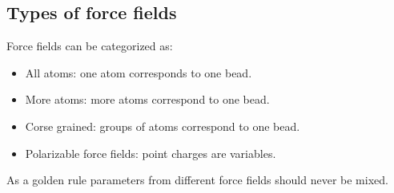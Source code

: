 	\subsection{Types of force fields}
	Force fields can be categorized as:

	\begin{multicols}{2}
		\begin{itemize}
			\item All atoms: one atom corresponds to one bead.
			\item More atoms: more atoms correspond to one bead.
			\item Corse grained: groups of atoms correspond to one bead.
			\item Polarizable force fields: point charges are variables.
		\end{itemize}
	\end{multicols}

	As a golden rule parameters from different force fields should never be mixed.
